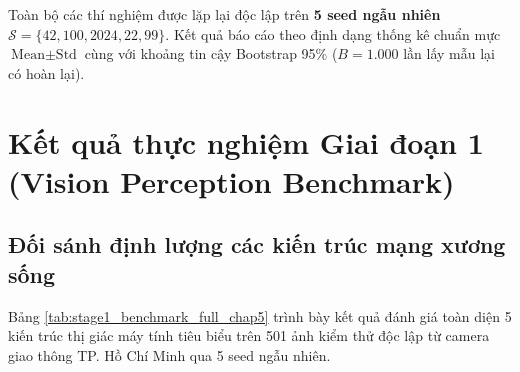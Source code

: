 Toàn bộ các thí nghiệm được lặp lại độc lập trên \textbf{5 seed ngẫu nhiên} $\mathcal{S} = \{42, 100, 2024, 22, 99\}$. Kết quả báo cáo theo định dạng thống kê chuẩn mực $\text{Mean} \pm \text{Std}$ cùng với khoảng tin cậy Bootstrap 95\% ($B = 1.000$ lần lấy mẫu lại có hoàn lại).

\section{Kết quả thực nghiệm Giai đoạn 1 (Vision Perception Benchmark)}
\label{sec:thuc_nghiem_giai_doan_1}

\subsection{Đối sánh định lượng các kiến trúc mạng xương sống}
Bảng \ref{tab:stage1_benchmark_full_chap5} trình bày kết quả đánh giá toàn diện 5 kiến trúc thị giác máy tính tiêu biểu trên 501 ảnh kiểm thử độc lập từ camera giao thông TP. Hồ Chí Minh qua 5 seed ngẫu nhiên.

